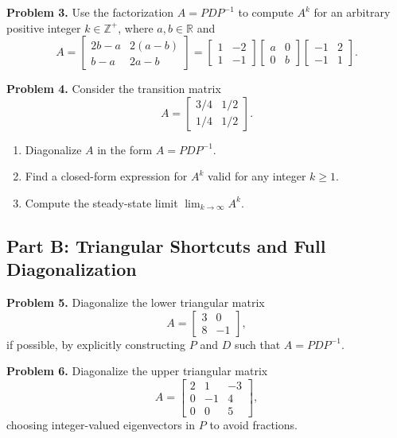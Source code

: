 \documentclass[11pt, letterpaper]{article}
\theoremstyle{definition}
\theoremstyle{remark}
\begin{document}
\textbf{Problem 3.}\label{prob:3}
Use the factorization $A = PDP^{-1}$ to compute $A^{k}$ for an arbitrary positive integer $k \in \mathbb{Z}^{+}$, where $a, b \in \mathbb{R}$ and
\[
A = \begin{bmatrix} 2b - a & 2(a - b) \\ b - a & 2a - b \end{bmatrix} = \begin{bmatrix} 1 & -2 \\ 1 & -1 \end{bmatrix} \begin{bmatrix} a & 0 \\ 0 & b \end{bmatrix} \begin{bmatrix} -1 & 2 \\ -1 & 1 \end{bmatrix}.
\]

\textbf{Problem 4.}\label{prob:4}
Consider the transition matrix
\[
A = \begin{bmatrix} 3/4 & 1/2 \\ 1/4 & 1/2 \end{bmatrix}.
\]
\begin{enumerate}[label=(\alph*)]
    \item Diagonalize $A$ in the form $A = PDP^{-1}$.
    \item Find a closed-form expression for $A^{k}$ valid for any integer $k \ge 1$.
    \item Compute the steady-state limit $\lim_{k \to \infty} A^{k}$.
\end{enumerate}

\subsection{Part B: Triangular Shortcuts and Full Diagonalization}

\textbf{Problem 5.}\label{prob:5}
Diagonalize the lower triangular matrix
\[
A = \begin{bmatrix} 3 & 0 \\ 8 & -1 \end{bmatrix},
\]
if possible, by explicitly constructing $P$ and $D$ such that $A = PDP^{-1}$.

\textbf{Problem 6.}\label{prob:6}
Diagonalize the upper triangular matrix
\[
A = \begin{bmatrix} 2 & 1 & -3 \\ 0 & -1 & 4 \\ 0 & 0 & 5 \end{bmatrix},
\]
choosing integer-valued eigenvectors in $P$ to avoid fractions.
\end{document}
